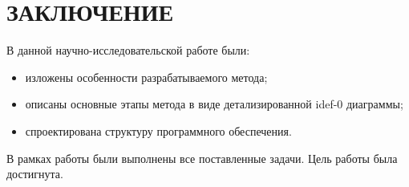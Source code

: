 \chapter*{ЗАКЛЮЧЕНИЕ}

В данной научно-исследовательской работе были:
\begin{itemize}
	\item изложены особенности разрабатываемого метода;
	\item описаны основные этапы метода в виде детализированной idef-0 диаграммы;
	\item спроектирована структуру программного обеспечения.
\end{itemize}

В рамках работы были выполнены все поставленные задачи. Цель работы была достигнута.